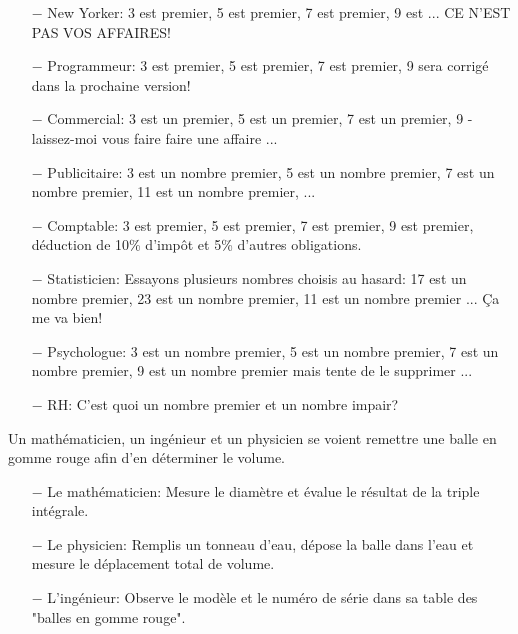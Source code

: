 \begin{itemize}
	\item[$-$] New Yorker: 3 est premier, 5 est premier, 7 est premier, 9 est ... CE N'EST PAS VOS AFFAIRES!

	\item[$-$] Programmeur: 3 est premier, 5 est premier, 7 est premier, 9 sera corrigé dans la prochaine version!

	\item[$-$] Commercial: 3 est un premier, 5 est un premier, 7 est un premier, 9 - laissez-moi vous faire faire une affaire ...

	\item[$-$] Publicitaire: 3 est un nombre premier, 5 est un nombre premier, 7 est un nombre premier, 11 est un nombre premier, ...

	\item[$-$] Comptable: 3 est premier, 5 est premier, 7 est premier, 9 est premier, déduction de 10\% d'impôt et 5\% d'autres obligations.

	\item[$-$] Statisticien: Essayons plusieurs nombres choisis au hasard: 17 est un nombre premier, 23 est un nombre premier, 11 est un nombre premier ... Ça me va bien!

	\item[$-$] Psychologue: 3 est un nombre premier, 5 est un nombre premier, 7 est un nombre premier, 9 est un nombre premier mais tente de le supprimer ...
	
	\item[$-$] RH: C'est quoi un nombre premier et un nombre impair?
\end{itemize}

	\begin{center}\underline{\hspace{5 cm}}\end{center}
	
Un mathématicien, un ingénieur et un physicien se voient remettre une balle en gomme rouge afin d'en déterminer le volume.

\begin{itemize}	 
	\item[$-$] Le mathématicien: Mesure le diamètre et évalue le résultat de la triple intégrale.

	\item[$-$] Le physicien: Remplis un tonneau d'eau, dépose la balle dans l'eau et mesure le déplacement total de volume.

	\item[$-$] L'ingénieur: Observe le modèle et le numéro de série dans sa table des "balles en gomme rouge".
\end{itemize}		
	\begin{center}\underline{\hspace{5 cm}}\end{center}

